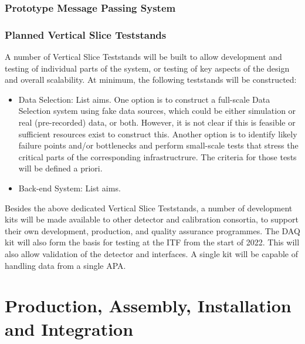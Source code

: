 \subsubsection{Prototype Message Passing System}
\label{sec:fd-daq:validation-demonstrators}


\subsubsection{Planned Vertical Slice Teststands}
\label{sec:sp-daq:validation-demonstrators}

A number of Vertical Slice Teststands will be built to allow
development and testing of individual parts of the  system,
or testing of key aspects of the design and overall scalability. At minimum, the following teststands
will be constructed:
\begin{itemize}
\item Data Selection: List aims. One option is to construct a
  full-scale Data Selection system using fake data 
sources, which could be either simulation or real (pre-recorded) data,
or both. However, it is not clear if this is feasible or sufficient
resources exist to construct this. Another option is to identify
likely failure points and/or bottlenecks and perform
small-scale tests that stress the critical parts of the corresponding
infrastructrure. The criteria for those tests will be defined a priori.
\item Back-end System: List aims.
\end{itemize}

Besides the above dedicated Vertical Slice Teststands, a number of
 development kits will be made available to other detector and
calibration consortia, to support 
their own development, production, and quality assurance programmes. The DAQ
kit will also form the basis for testing at the ITF from the start of 2022. This will
also allow validation of the detector and  interfaces. A
single  kit will be capable of handling data from a single APA. 

\section{Production, Assembly, Installation and Integration}
\label{sec:sp-daq:production}

